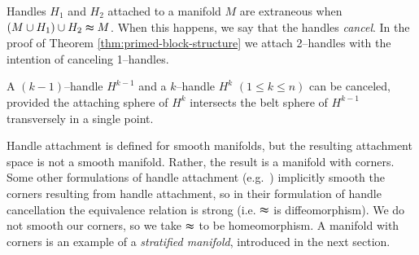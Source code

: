 Handles $H_1$ and $H_2$ attached to a manifold $M$ are extraneous when $(M\cup H_1)\cup H_2\thickapprox M$.
When this happens, we say that the handles \emph{cancel}.
In the proof of Theorem \ref{thm:primed-block-structure} we attach 2--handles with the intention of canceling 1--handles.


\begin{prop}
	A $(k-1)$--handle $H^{k-1}$ and a $k$--handle $H^k$ $(1\leq k\leq n)$ can be canceled, provided the attaching sphere of $H^k$ intersects the belt sphere of $H^{k-1}$ transversely in a single point.
\end{prop}

Handle attachment is defined for smooth manifolds, but the resulting attachment space is not a smooth manifold.
Rather, the result is a manifold with corners.
Some other formulations of handle attachment (e.g.\ \cite{GompStip}) implicitly smooth the corners resulting from handle attachment, so in their formulation of handle cancellation the equivalence relation is strong (i.e. $\thickapprox$ is diffeomorphism).
We do not smooth our corners, so we take $\thickapprox$ to be homeomorphism.
A manifold with corners is an example of a \emph{stratified manifold}, introduced in the next section.




